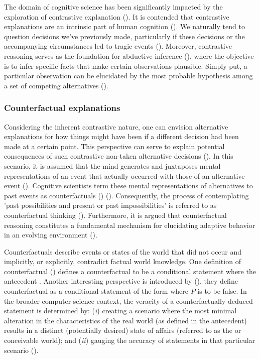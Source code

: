 \documentclass[binding=0.6cm]{sapthesis}
\newcommand{\mycite}[1]{(\cite{#1})}
\begin{document}
The domain of cognitive science has been significantly impacted by the exploration of contrastive explanation \mycite{roese1997-cf-thinking,chinParker2017-ACA}. It is contended that contrastive explanations are an intrinsic part of human cognition \mycite{byrne2002-mental-models}. We naturally tend to question decisions we've previously made, particularly if these decisions or the accompanying circumstances led to tragic events \mycite{wenzlhuemer2009-cf-scientific}. Moreover, contrastive reasoning serves as the foundation for abductive inference \mycite{folger2016-abduction101}, where the objective is to infer specific facts that make certain observations plausible. Simply put, a particular observation can be elucidated by the most probable hypothesis among a set of competing alternatives \mycite{rappaport1996-inf-best}.

\subsubsection{Counterfactual explanations}
\label{sec:bg.xai.counterfactual}
Considering the inherent contrastive nature, one can envision alternative explanations for how things might have been if a different decision had been made at a certain point. This perspective can serve to explain potential consequences of such contrastive non-taken alternative decisions \mycite{stepin2021-xai-cf-contrative-survey}. In this scenario, it is assumed that the mind generates and juxtaposes mental representations of an event that actually occurred with those of an alternative event \mycite{byrne2015-cf-thought}. Cognitive scientists term these mental representations of alternatives to past events as counterfactuals () \mycite{roese1997-cf-thinking}. Consequently, the process of contemplating 'past possibilities and present or past impossibilities' is referred to as counterfactual thinking \mycite{byrne1997-cognitivePI}. Furthermore, it is argued that counterfactual reasoning constitutes a fundamental mechanism for elucidating adaptive behavior in an evolving environment \mycite{paik2014-cf-reason-key,zhou2015-learning,zhang2015-reinforcement}.

Counterfactuals describe events or states of the world that did not occur and implicitly, or explicitly, contradict factual world knowledge. One definition of counterfactual \mycite{grahne1991-updates-and-cf} defines a counterfactual to be a conditional statement where the antecedent . Another interesting perspective is introduced by \mycite{ginsberg1986-counterfactuals}, they define counterfactual as a conditional statement of the form  where $P$ is  to be false. 
In the broader computer science context, the veracity of a counterfactually deduced statement is determined by: (\textit{i}) creating a scenario where the most minimal alteration in the characteristics of the real world (as defined in the antecedent) results in a distinct (potentially desired) state of affairs (referred to as the  or  conceivable world); and (\textit{ii}) gauging the accuracy of statements in that particular scenario \mycite{lewis1989-plurality-worlds}.
\end{document}
